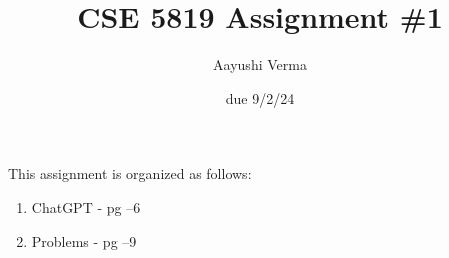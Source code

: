 \documentclass{article}
\title{CSE 5819 Assignment \#1}
\author{Aayushi Verma}
\date{due 9/2/24}
\begin{document}
\maketitle

This assignment is organized as follows:

\begin{enumerate}
    \item ChatGPT - pg \pageref{chatgpt_start}--6%
    \item Problems - pg \pageref{problems_start}--9%
\end{enumerate}

\label{chatgpt_start}
 
\label{chatgpt_end}

\label{problems_start}
  
\label{problems_end}
\end{document}
